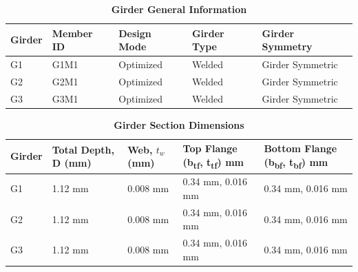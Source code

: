 \documentclass[12pt,a4paper]{report}
\numberwithin{table}{chapter}
\numberwithin{figure}{chapter}
\begin{document}
\newpage

\vspace{0.4em}
\noindent
            
\vspace{4pt}
\begin{longtable}{|L{2.2cm}|L{1.8cm}|p{3.8cm}|p{3.8cm}|p{3.8cm}|}
\caption{\textbf{Girder General Information}}
\hline
\textbf{Girder} & \textbf{Member ID} & \textbf{Design Mode} & \textbf{Girder Type} & \textbf{Girder Symmetry} \\[6pt]
\hline
G1 & G1M1 & Optimized & Welded & Girder Symmetric \\[8pt]
\hline
G2 & G2M1 & Optimized & Welded & Girder Symmetric \\[8pt]
\hline
G3 & G3M1 & Optimized & Welded & Girder Symmetric \\[8pt]
\hline
\end{longtable}

\vspace{0.6em}

\vspace{4pt}
\begin{longtable}{|L{1.8cm}|L{2.3cm}|L{1.8cm}|p{4.8cm}|p{4.8cm}|}
\caption{\textbf{Girder Section Dimensions}}
\hline
\textbf{Girder} & \textbf{Total Depth, D (mm)} & \textbf{Web, $t_w$ (mm)} & \textbf{Top Flange (b\textsubscript{tf}, t\textsubscript{tf}) mm} & \textbf{Bottom Flange (b\textsubscript{bf}, t\textsubscript{bf}) mm} \\[6pt]
\hline
G1 & 1.12 mm & 0.008 mm & 0.34 mm, 0.016 mm & 0.34 mm, 0.016 mm \\[8pt]
\hline
G2 & 1.12 mm & 0.008 mm & 0.34 mm, 0.016 mm & 0.34 mm, 0.016 mm \\[8pt]
\hline
G3 & 1.12 mm & 0.008 mm & 0.34 mm, 0.016 mm & 0.34 mm, 0.016 mm \\[8pt]
\hline
\end{longtable}

\vspace{0.6em}
\end{document}
